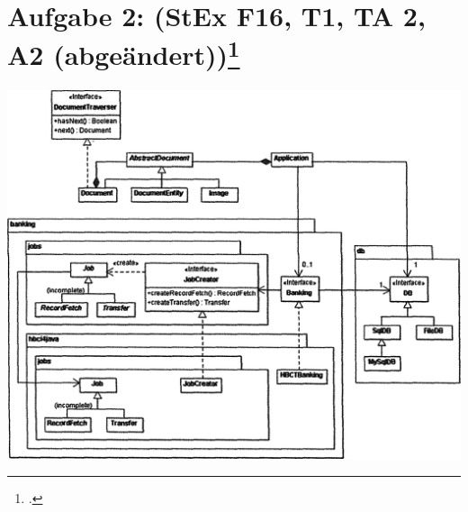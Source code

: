 \documentclass{lehramt-informatik}
\begin{document}
%

\section{Aufgabe 2: (StEx F16, T1, TA 2, A2 (abgeändert))\footcite{sosy:ab:6}}

\includegraphics[width=\linewidth]{UML-Examen_2016-03.png}
\end{document}
